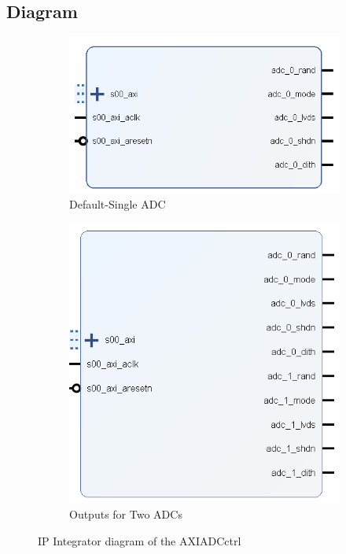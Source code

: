 \documentclass[11pt]{article}
\begin{document}
\subsection{Diagram}
\begin{figure}[H]
	\centering
	\begin{subfigure}[t]{0.4\linewidth}
		\includegraphics[width=\linewidth]{images/AXI_ADC_ctrl}
		\caption{Default-Single ADC}
	\end{subfigure}
	\begin{subfigure}[t]{0.4\linewidth}
		\includegraphics[width=\linewidth]{images/AXI_ADC_ctrl_extended}
		\caption{Outputs for Two ADCs}
	\end{subfigure}
	\caption{IP Integrator diagram of the AXI\textunderscore ADC\textunderscore ctrl}
\end{figure}
\end{document}
